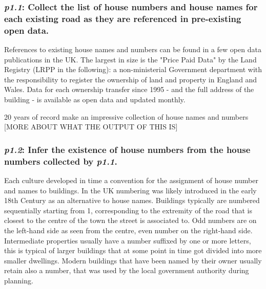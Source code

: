    \subsubsection{{\it p1.1}: Collect the list of house numbers and house names for each existing road as they are referenced in pre-existing open data.} 

        References to existing house names and numbers can be found in a few open data publications in the UK. The largest in size is the "Price Paid Data" by the Land Registry (LRPP in the following): a non-ministerial Government department with the responsibility to register the ownership of land and property in England and Wales. Data for each ownership transfer since 1995 - and the full address of the building - is available as open data and updated monthly.
        
        20 years of record make an impressive collection of house names and numbers [MORE ABOUT WHAT THE OUTPUT OF THIS IS]

    \subsubsection{{\it p1.2}: Infer the existence of house numbers from the house numbers collected by {\it p1.1}.} 

        Each culture developed in time a convention for the assignment of house number and names to buildings. In the UK numbering was likely introduced in the early 18th Century as an alternative to house names. Buildings typically are numbered sequentially starting from 1, corresponding to the extremity of the road that is closest to the centre of the town the street is associated to. Odd numbers are on the left-hand side as seen from the centre, even number on the right-hand side. Intermediate properties usually have a number suffixed by one or more letters, this is typical of larger buildings that at some point in time got divided into more smaller dwellings. Modern buildings that have been named by their owner usually retain also a number, that was used by the local government authority during planning.
        
